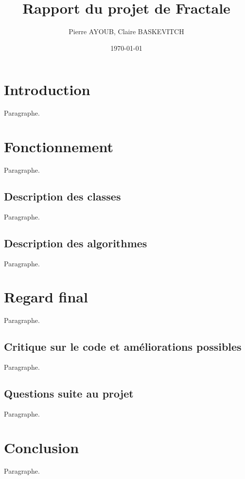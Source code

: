 \documentclass[11pt]{article}
\title{Rapport du projet de Fractale}
\author{Pierre AYOUB, Claire BASKEVITCH}
\date\today
\begin{document}
\maketitle

\section{Introduction}

Paragraphe.

\section{Fonctionnement}

Paragraphe.

\subsection{Description des classes}

Paragraphe.

\subsection{Description des algorithmes}

Paragraphe.

\section{Regard final}

Paragraphe.

\subsection{Critique sur le code et améliorations possibles}

Paragraphe.

\subsection{Questions suite au projet}

Paragraphe.

\section{Conclusion}

Paragraphe.
\end{document}

